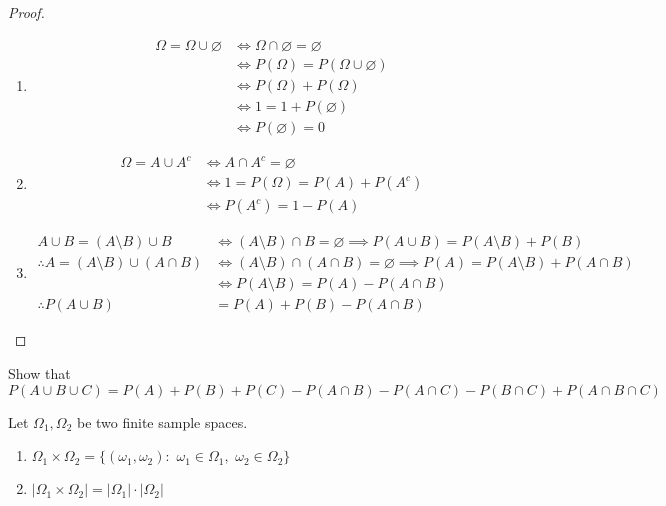 \documentclass{article}
\begin{document}
	\begin{proof}
		\begin{enumerate}
			\item 
			\begin{align*}
				\Omega = \Omega \cup \varnothing &\iff \Omega \cap \varnothing = \varnothing \\
				&\iff P(\Omega) = P(\Omega \cup \varnothing)\\
				&\iff P(\Omega) + P(\Omega) \\
				&\iff 1= 1+ P(\varnothing) \\
				&\iff P(\varnothing) = 0
			\end{align*}
			\item 
			\begin{align*}
				\Omega = A \cup A^c &\iff A \cap A^c = \varnothing \\
				&\iff 1 = P(\Omega) = P(A) + P(A^c)\\
				&\iff P(A^c) = 1 - P(A)
			\end{align*}
			\item
			\begin{align*}
				A \cup B = (A \setminus B) \cup B &\iff (A \setminus B) \cap B = \varnothing \implies P(A \cup B) = P(A \setminus B) + P(B)\\
				\therefore A = (A\setminus B) \cup (A \cap B) &\iff (A \setminus B) \cap (A \cap B) = \varnothing \implies P(A) = P(A \setminus B) + P(A \cap B) \\
				&\iff P(A \setminus B) = P(A) - P(A \cap B) \\
				\therefore P(A \cup B) &= P(A) + P(B) - P(A \cap B)
			\end{align*}
		\end{enumerate}
	\end{proof}
	\begin{exe}
		Show that $P(A \cup B \cup C) = P(A) + P(B) + P(C) - P(A \cap B) - P(A \cap C) -  P(B \cap C) + P(A \cap B \cap C)$
	\end{exe}
	\begin{defn}
		Let $\Omega_1, \Omega_2$  be two finite sample spaces.
		\begin{enumerate}
			\item $\Omega_1 \times \Omega_2 = \{ (\omega_1, \omega_2): \,\,  \omega_1 \in \Omega_1, \,\,  \omega_2 \in \Omega_2 \}$
			\item $|\Omega_1 \times \Omega_2| = |\Omega_1| \cdot |\Omega_2|$
		\end{enumerate}
	\end{defn}
\end{document}
